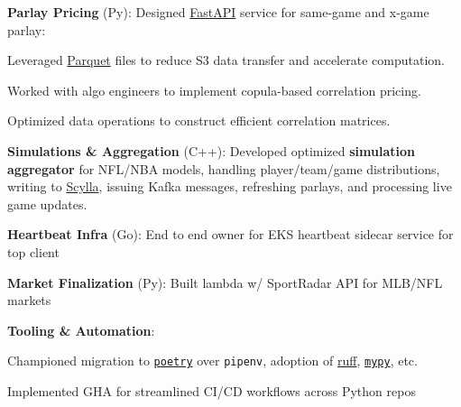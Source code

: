 \documentclass[]{deedy-resume}
\begin{document}
\begin{minipage}[t]{0.66\textwidth}
\begin{tightitemize}
    \item \textbf{Parlay Pricing} (Py): Designed \href{https://fastapi.tiangolo.com/}{FastAPI} service for same-game and x-game parlay:
    \vspace{3pt}
    \begin{tightitemize}
        \item Leveraged \href{https://parquet.apache.org/}{Parquet} files to reduce S3 data transfer and accelerate computation.
        \item Worked with algo engineers to implement copula-based correlation pricing.
        \item Optimized data operations to construct efficient correlation matrices.
    \end{tightitemize}
    \vspace{3pt}
    \item \textbf{Simulations \& Aggregation} (C++): Developed optimized \textbf{simulation aggregator} for NFL/NBA models, handling player/team/game distributions, writing to \href{https://www.scylladb.com/}{Scylla}, issuing Kafka messages, refreshing parlays, and processing live game updates.
    \item \textbf{Heartbeat Infra} (Go): End to end owner for EKS heartbeat sidecar service for top client
    \item \textbf{Market Finalization} (Py): Built lambda w/ SportRadar API for MLB/NFL markets
    \item \textbf{Tooling \& Automation}:
    \vspace{5pt}
    \begin{tightitemize}
        \item Championed migration to \href{https://python-poetry.org/}{\texttt{poetry}} over \texttt{pipenv}, adoption of \href{https://beta.ruff.rs/docs/}{ruff}, \href{https://mypy.readthedocs.io/en/stable/}{\texttt{mypy}}, etc.
        \item Implemented GHA for streamlined CI/CD workflows across Python repos
    \end{tightitemize}
\end{tightitemize}
\sectionspace


\end{minipage}
\end{document}
